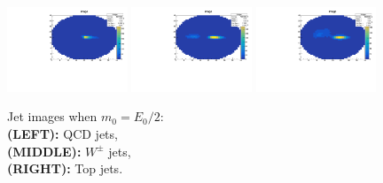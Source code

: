 \begin{figure}
    \begin{center}
        \includegraphics[width=0.32\textwidth]{./5/imageQCD.pdf}
        \includegraphics[width=0.32\textwidth]{./5/imageW.pdf}
        \includegraphics[width=0.32\textwidth]{./5/imageTOP.pdf}
        \caption{
            Jet images when $m_{0}=E_{0}/2$:\\
            {\bf(LEFT):} QCD jets,\\
            {\bf(MIDDLE):} $W^{\pm}$ jets,\\
            {\bf(RIGHT):} Top jets.
        }
        \label{fig:case5}
    \end{center}
\end{figure}

